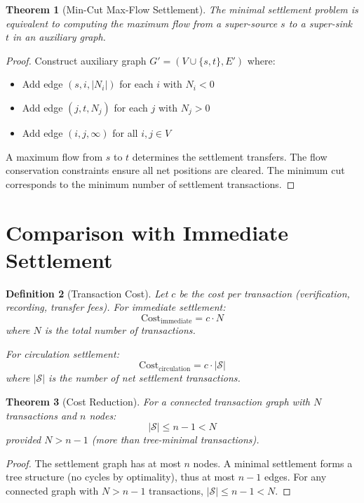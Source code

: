 \documentclass[12pt]{article}
\newtheorem{theorem}{Theorem}
\newtheorem{definition}[theorem]{Definition}
\begin{document}
\begin{theorem}[Min-Cut Max-Flow Settlement]
The minimal settlement problem is equivalent to computing the maximum flow from a super-source $s$ to a super-sink $t$ in an auxiliary graph.
\end{theorem}

\begin{proof}
Construct auxiliary graph $G' = (V \cup \{s,t\}, E')$ where:
\begin{itemize}
    \item Add edge $(s, i, |N_i|)$ for each $i$ with $N_i < 0$
    \item Add edge $(j, t, N_j)$ for each $j$ with $N_j > 0$
    \item Add edge $(i, j, \infty)$ for all $i,j \in V$
\end{itemize}

A maximum flow from $s$ to $t$ determines the settlement transfers. The flow conservation constraints ensure all net positions are cleared. The minimum cut corresponds to the minimum number of settlement transactions.
\end{proof}

\section{Comparison with Immediate Settlement}

\begin{definition}[Transaction Cost]
Let $c$ be the cost per transaction (verification, recording, transfer fees). For immediate settlement:
$$
\text{Cost}_{\text{immediate}} = c \cdot N
$$
where $N$ is the total number of transactions.

For circulation settlement:
$$
\text{Cost}_{\text{circulation}} = c \cdot |\mathcal{S}|
$$
where $|\mathcal{S}|$ is the number of net settlement transactions.
\end{definition}

\begin{theorem}[Cost Reduction]
For a connected transaction graph with $N$ transactions and $n$ nodes:
$$
|\mathcal{S}| \leq n - 1 < N
$$
provided $N > n-1$ (more than tree-minimal transactions).
\end{theorem}

\begin{proof}
The settlement graph has at most $n$ nodes. A minimal settlement forms a tree structure (no cycles by optimality), thus at most $n-1$ edges. For any connected graph with $N > n-1$ transactions, $|\mathcal{S}| \leq n-1 < N$.
\end{proof}
\end{document}
